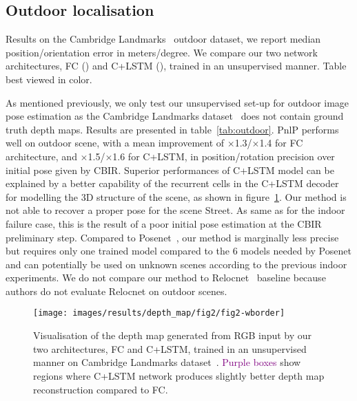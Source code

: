 \subsection{Outdoor localisation}
\label{subseq:outdoor}

\begin{table}[t]
	\centering
	
	\vspace{5pt}
	\caption{\label{tab:outdoor} Results on the Cambridge Landmarks~\citep{Kendall2015} outdoor dataset, we report median position/orientation error in meters/degree. We compare our two network architectures, FC () and C+LSTM (), trained in an unsupervised manner. Table best viewed in color.}
\end{table}

As mentioned previously, we only test our unsupervised set-up for outdoor image pose estimation as the Cambridge Landmarks dataset~\citep{Kendall2015} does not contain ground truth depth maps. Results are presented in table~\ref{tab:outdoor}. PnlP performs well on outdoor scene, with a mean improvement of $\times$1.3/$\times$1.4 for FC architecture, and $\times$1.5/$\times$1.6 for C+LSTM, in position/rotation precision over initial pose given by CBIR. Superior performances of C+LSTM model can be explained by a better capability of the recurrent cells in the C+LSTM decoder for modelling the 3D structure of the scene, as shown in figure~\ref{fig:depth_map_outdoor}. Our method is not able to recover a proper pose for the scene Street. As same as for the indoor failure case, this is the result of a poor initial pose estimation at the CBIR preliminary step. Compared to Posenet~\citep{Kendall2017}, our method is marginally less precise but requires only one trained model compared to the 6 models needed by Posenet and can potentially be used on unknown scenes according to the previous indoor experiments. We do not compare our method to Relocnet~\citep{Purkait2018} baseline because authors do not evaluate Relocnet on outdoor scenes.

\begin{figure}[t]
    \centering
	\texttt{[image: images/results/depth\_map/fig2/fig2-wborder]}
	\caption{\label{fig:depth_map_outdoor} Visualisation of the depth map generated from RGB input by our two architectures, FC and C+LSTM, trained in an unsupervised manner on Cambridge Landmarks dataset~\citep{Kendall2015}. \textcolor{purple}{Purple boxes} show regions where C+LSTM network produces slightly better depth map reconstruction compared to FC.}
\end{figure}

